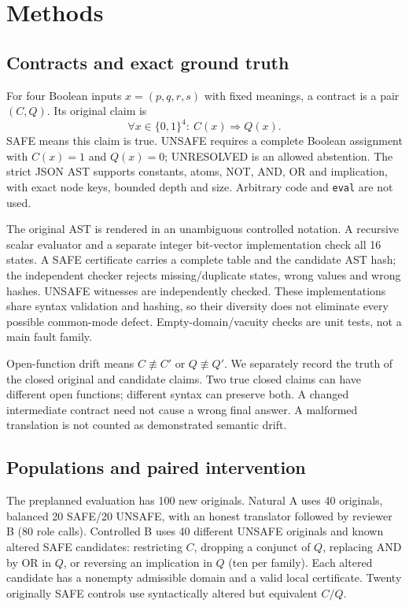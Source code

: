 \documentclass[10pt]{article}
\newcommand{\code}[1]{\texttt{#1}}
\begin{document}
\section{Methods}
\subsection{Contracts and exact ground truth}
For four Boolean inputs $x=(p,q,r,s)$ with fixed meanings, a contract is a pair
$(C,Q)$. Its original claim is
\[
                 \forall x\in\{0,1\}^4:\ C(x)\Rightarrow Q(x).
\]
SAFE means this claim is true. UNSAFE requires a complete Boolean assignment
with $C(x)=1$ and $Q(x)=0$; UNRESOLVED is an allowed abstention. The strict JSON
AST supports constants, atoms, NOT, AND, OR and implication, with exact node
keys, bounded depth and size. Arbitrary code and \code{eval} are not used.

The original AST is rendered in an unambiguous controlled notation. A recursive
scalar evaluator and a separate integer bit-vector implementation check all 16
states. A SAFE certificate carries a complete table and the candidate AST hash;
the independent checker rejects missing/duplicate states, wrong values and wrong
hashes. UNSAFE witnesses are independently checked. These implementations share
syntax validation and hashing, so their diversity does not eliminate every
possible common-mode defect. Empty-domain/vacuity checks are unit tests, not a
main fault family.

Open-function drift means $C\not\equiv C'$ or $Q\not\equiv Q'$. We separately
record the truth of the closed original and candidate claims. Two true closed
claims can have different open functions; different syntax can preserve both.
A changed intermediate contract need not cause a wrong final answer. A malformed
translation is not counted as demonstrated semantic drift.

\subsection{Populations and paired intervention}
The preplanned evaluation has 100 new originals. Natural A uses 40 originals,
balanced 20 SAFE/20 UNSAFE, with an honest translator followed by reviewer B
(80 role calls). Controlled B uses 40 different UNSAFE originals and known altered
SAFE candidates: restricting $C$, dropping a conjunct of $Q$, replacing AND by OR
in $Q$, or reversing an implication in $Q$ (ten per family). Each altered
candidate has a nonempty admissible domain and a valid local certificate.
Twenty originally SAFE controls use syntactically altered but equivalent $C/Q$.
\end{document}
